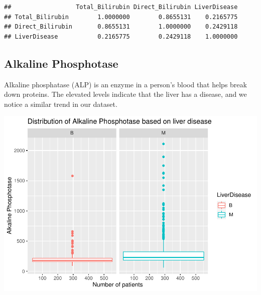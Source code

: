 \documentclass[]{article}
\newenvironment{Shaded}{\begin{snugshade}}{\end{snugshade}}
\newcommand{\CommentTok}[1]{\textcolor[rgb]{0.56,0.35,0.01}{\textit{#1}}}
\newcommand{\DataTypeTok}[1]{\textcolor[rgb]{0.13,0.29,0.53}{#1}}
\newcommand{\KeywordTok}[1]{\textcolor[rgb]{0.13,0.29,0.53}{\textbf{#1}}}
\newcommand{\NormalTok}[1]{#1}
\newcommand{\OperatorTok}[1]{\textcolor[rgb]{0.81,0.36,0.00}{\textbf{#1}}}
\newcommand{\StringTok}[1]{\textcolor[rgb]{0.31,0.60,0.02}{#1}}
\begin{document}
\begin{verbatim}
##                  Total_Bilirubin Direct_Bilirubin LiverDisease
## Total_Bilirubin        1.0000000        0.8655131    0.2165775
## Direct_Bilirubin       0.8655131        1.0000000    0.2429118
## LiverDisease           0.2165775        0.2429118    1.0000000
\end{verbatim}

\subsection{Alkaline Phosphotase}

Alkaline phosphatase (ALP) is an enzyme in a person's blood that helps
break down proteins. The elevated levels indicate that the liver has a
disease, and we notice a similar trend in our dataset.

\begin{Shaded}
\end{Shaded}

\includegraphics{LiverDisease_files/figure-latex/unnamed-chunk-17-1.pdf}
\end{document}
